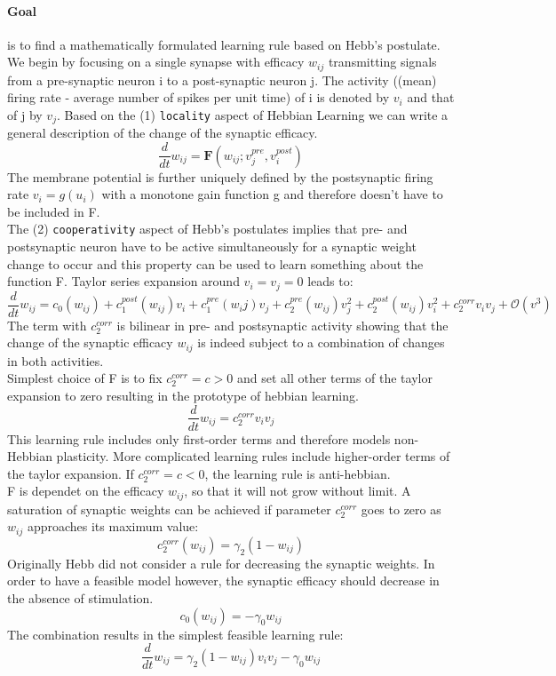 \documentclass[11pt]{article}
\begin{document}
\paragraph{Goal} is to find a mathematically formulated learning rule based on Hebb's postulate.\\
We begin by focusing on a single synapse with efficacy $w_{ij}$ transmitting signals from a pre-synaptic neuron i to a post-synaptic neuron j. The activity ((mean) firing rate - average number of spikes per unit time) of i is denoted by $v_i$ and that of j by $v_j$. Based on the (1) \texttt{locality} aspect of Hebbian Learning we can write a general description of the change of the synaptic efficacy. 
\[
\frac{d}{dt}w_{ij}=\mathbf{F}(w_{ij}; v_j^{pre}, v_i^{post})
\]
The membrane potential is further uniquely defined by the postsynaptic firing rate $v_i = g(u_i)$ with a monotone gain function g and therefore doesn't have to be included in F.\\
The (2) \texttt{cooperativity} aspect of Hebb's postulates implies that pre- and postsynaptic neuron have to be active simultaneously for a synaptic weight change to occur and this property can be used to learn something about the function F. Taylor series expansion around $v_i=v_j=0$ leads to:
\[
\frac{d}{dt}w_{ij}=c_0(w_{ij})+c_1^{post}(w_{ij})v_i+c_1^{pre}(w_ij)v_j+c_2^{pre}(w_{ij})v_j^2+c_2^{post}(w_{ij})v_i^2+c_2^{corr}v_i v_j+\mathcal{O}(v^3)
\]
The term with $c_2^{corr}$ is bilinear in pre- and postsynaptic activity showing that the change of the synaptic efficacy $w_{ij}$ is indeed subject to a combination of changes in both activities.\\
Simplest choice of F is to fix $c_2^{corr}=c>0$ and set all other terms of the taylor expansion to zero resulting in the prototype of hebbian learning.\\
\[
\frac{d}{dt}w_{ij}=c_2^{corr}v_i v_j
\]
This learning rule includes only first-order terms and therefore models non-Hebbian plasticity. More complicated learning rules include higher-order terms of the taylor expansion. If $c_2^{corr}=c<0$, the learning rule is anti-hebbian.\\
F is dependet on the efficacy $w_{ij}$, so that it will not grow without limit. A saturation of synaptic weights can be achieved if parameter $c_2^{corr}$ goes to zero as $w_{ij}$ approaches its maximum value:
\[
	c_2^{corr}(w_{ij})=\gamma_2(1-w_{ij})
\]
Originally Hebb did not consider a rule for decreasing the synaptic weights. In order to have a feasible model however, the synaptic efficacy should decrease in the absence of stimulation.\\
\[
	c_0(w_{ij})=-\gamma_0 w_{ij}
\]
The combination results in the simplest feasible learning rule:
\[
\frac{d}{dt}w_{ij}=\gamma_2(1-w_{ij})v_i v_j-\gamma_0 w_{ij}
\]
\end{document}
